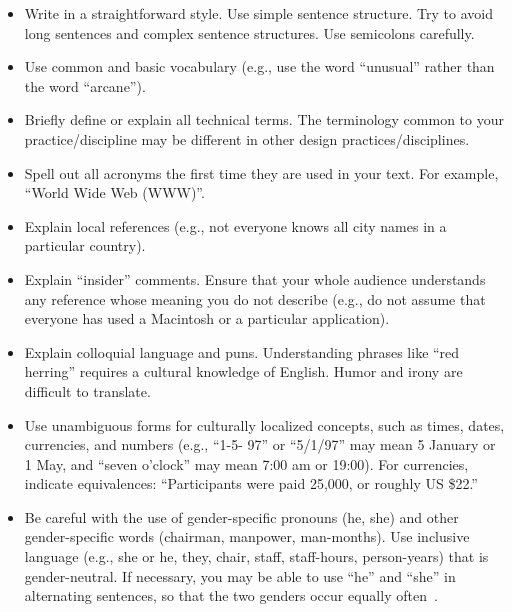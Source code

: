 \documentclass{sigchi-ext}
\begin{document}
\begin{itemize}\compresslist%
\item Write in a straightforward style. Use simple sentence
  structure. Try to avoid long sentences and complex sentence
  structures. Use semicolons carefully.
\item Use common and basic vocabulary (e.g., use the word ``unusual''
  rather than the word ``arcane'').
\item Briefly define or explain all technical terms. The terminology
  common to your practice/discipline may be different in other design
  practices/disciplines.
\item Spell out all acronyms the first time they are used in your
  text. For example, ``World Wide Web (WWW)''.
\item Explain local references (e.g., not everyone knows all city
  names in a particular country).
\item Explain ``insider'' comments. Ensure that your whole audience
  understands any reference whose meaning you do not describe (e.g.,
  do not assume that everyone has used a Macintosh or a particular
  application).
\item Explain colloquial language and puns. Understanding phrases like
  ``red herring'' requires a cultural knowledge of English. Humor and
  irony are difficult to translate.
\item Use unambiguous forms for culturally localized concepts, such as
  times, dates, currencies, and numbers (e.g., ``1-5- 97'' or
  ``5/1/97'' may mean 5 January or 1 May, and ``seven o'clock'' may
  mean 7:00 am or 19:00). For currencies, indicate equivalences:
  ``Participants were paid {\selectfont \textwon}
  25,000, or roughly US \$22.''
\item Be careful with the use of gender-specific pronouns (he, she)
  and other gender-specific words (chairman, manpower,
  man-months). Use inclusive language (e.g., she or he, they, chair,
  staff, staff-hours, person-years) that is gender-neutral. If
  necessary, you may be able to use ``he'' and ``she'' in alternating
  sentences, so that the two genders occur equally
  often~\cite{Schwartz:1995:GBF}.
\end{itemize}

\end{document}
